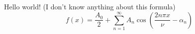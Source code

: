 \documentclass{article}
\begin{document}
Hello world! (I don't know anything about this formula)
\begin{equation}\label{eq:fourierrow}
f(x) = \frac{A_0}{2} + \sum \limits_{n=1}^{\infty} A_n \cos \left( \frac{2 n \pi x}{\nu} - \alpha_n \right) 
\end{equation}
\end{document}
